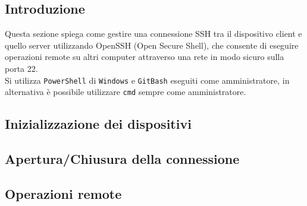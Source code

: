 \subsection*{Introduzione}
Questa sezione spiega come gestire una connessione SSH tra il dispositivo client e quello server utilizzando OpenSSH (Open Secure Shell), che consente di eseguire operazioni remote su altri computer attraverso una rete in modo sicuro sulla porta 22.\vspace{.3cm}\\
Si utilizza \texttt{PowerShell} di \texttt{Windows} e \texttt{GitBash} eseguiti come amministratore, in alternativa è possibile utilizzare \texttt{cmd} sempre come amministratore.

\subsection{Inizializzazione dei dispositivi}
\subsection{Apertura/Chiusura della connessione}
\subsection{Operazioni remote}
